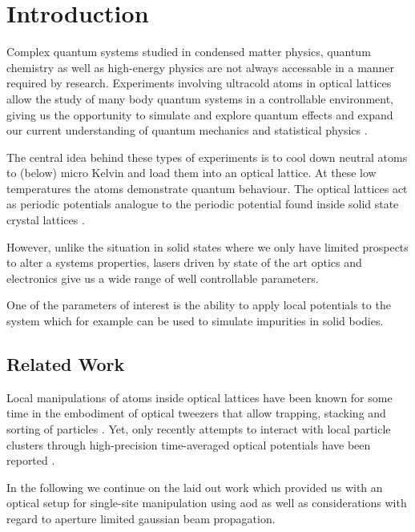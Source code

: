 \chapter{Introduction}

Complex quantum systems studied in condensed matter physics, quantum chemistry
as well as high-energy physics are not always accessable in a manner
required by research. Experiments involving ultracold atoms in optical
lattices allow the study of many body quantum systems in a controllable
environment, giving us the opportunity to simulate and explore quantum
effects and expand our current understanding of quantum mechanics and
statistical physics \cite{Gross2017}.

The central idea behind these types of experiments is to cool down neutral
atoms to (below) micro Kelvin and load them into an optical lattice. At these
low temperatures the atoms demonstrate quantum behaviour. The optical lattices
act as periodic potentials analogue to the periodic potential found inside
solid state crystal lattices \cite{Lewenstein2007}.

However, unlike the situation in solid states where we only have limited
prospects to alter a systems properties, lasers driven by state of the art
optics and electronics give us a wide range of well controllable parameters.

One of the parameters of interest is the ability to apply local potentials
to the system which for example can be used to simulate impurities in solid
bodies.

\section{Related Work}


Local manipulations of atoms inside optical lattices have been known for some
time in the embodiment of optical tweezers that allow trapping, stacking and
sorting of particles \cite{Tadmor2004}. Yet, only recently attempts to
interact with local particle clusters through high-precision time-averaged
optical potentials have been reported \cite{Roy2016}.

In the following we continue on the laid out work \cite{Hertlein2017} which
provided us with an optical setup for single-site manipulation using
\gls{aod} as well as considerations with regard to aperture limited
gaussian beam propagation.

